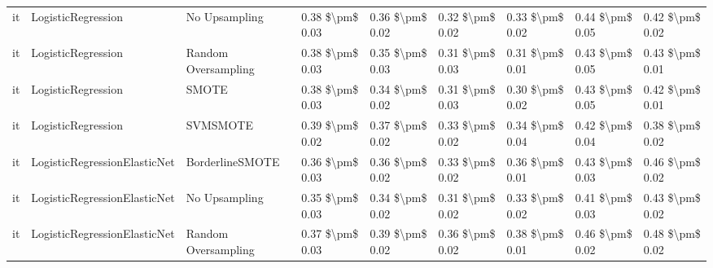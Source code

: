 \begin{tabular}{lllllllll}
      it &              LogisticRegression &                 No Upsampling &     0.38 \$\textbackslash pm\$ 0.03 &           0.36 \$\textbackslash pm\$ 0.02 &       0.32 \$\textbackslash pm\$ 0.02 &        0.33 \$\textbackslash pm\$ 0.02 &                         0.44 \$\textbackslash pm\$ 0.05 &     0.42 \$\textbackslash pm\$ 0.02 \\
      it &              LogisticRegression &           Random Oversampling &     0.38 \$\textbackslash pm\$ 0.03 &           0.35 \$\textbackslash pm\$ 0.03 &       0.31 \$\textbackslash pm\$ 0.03 &        0.31 \$\textbackslash pm\$ 0.01 &                         0.43 \$\textbackslash pm\$ 0.05 &     0.43 \$\textbackslash pm\$ 0.01 \\
      it &              LogisticRegression &                         SMOTE &     0.38 \$\textbackslash pm\$ 0.03 &           0.34 \$\textbackslash pm\$ 0.02 &       0.31 \$\textbackslash pm\$ 0.03 &        0.30 \$\textbackslash pm\$ 0.02 &                         0.43 \$\textbackslash pm\$ 0.05 &     0.42 \$\textbackslash pm\$ 0.01 \\
      it &              LogisticRegression &                      SVMSMOTE &     0.39 \$\textbackslash pm\$ 0.02 &           0.37 \$\textbackslash pm\$ 0.02 &       0.33 \$\textbackslash pm\$ 0.02 &        0.34 \$\textbackslash pm\$ 0.04 &                         0.42 \$\textbackslash pm\$ 0.04 &     0.38 \$\textbackslash pm\$ 0.02 \\
      it &    LogisticRegressionElasticNet &               BorderlineSMOTE &     0.36 \$\textbackslash pm\$ 0.03 &           0.36 \$\textbackslash pm\$ 0.02 &       0.33 \$\textbackslash pm\$ 0.02 &        0.36 \$\textbackslash pm\$ 0.01 &                         0.43 \$\textbackslash pm\$ 0.03 &     0.46 \$\textbackslash pm\$ 0.02 \\
      it &    LogisticRegressionElasticNet &                 No Upsampling &     0.35 \$\textbackslash pm\$ 0.03 &           0.34 \$\textbackslash pm\$ 0.02 &       0.31 \$\textbackslash pm\$ 0.02 &        0.33 \$\textbackslash pm\$ 0.02 &                         0.41 \$\textbackslash pm\$ 0.03 &     0.43 \$\textbackslash pm\$ 0.02 \\
      it &    LogisticRegressionElasticNet &           Random Oversampling &     0.37 \$\textbackslash pm\$ 0.03 &           0.39 \$\textbackslash pm\$ 0.02 &       0.36 \$\textbackslash pm\$ 0.02 &        0.38 \$\textbackslash pm\$ 0.01 &                         0.46 \$\textbackslash pm\$ 0.02 &     0.48 \$\textbackslash pm\$ 0.02 \\

\end{tabular}
